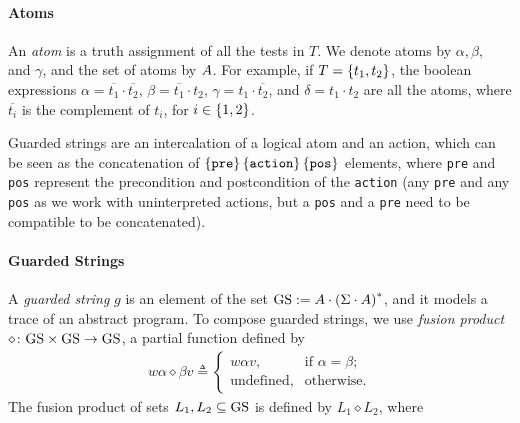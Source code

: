 
\paragraph*{Atoms}
An \emph{atom} is a truth assignment of all the tests in $T$.  %
We denote atoms by $\alpha, \beta,$ and $\gamma$, and the set of atoms by $A$. For example, if $T=\left\{t_1,t_2\right\}$, the boolean expressions $\alpha=\overline{t_1}\cdot \overline{t_2}$, $\beta=\overline{t_1}\cdot {t_2}$, $\gamma=t_1\cdot \overline{t_2}$, and $\delta=t_1\cdot {t_2}$ are all the atoms, where $\overline{t_i}$ is the complement of $t_i$, for $i\in \left\{1,2\right\}$.

Guarded strings 
are an intercalation of a logical atom and an action, which can be seen as the concatenation 
of $\left\{\texttt{pre}\right\}\left\{\texttt{action}\right\}\left\{\texttt{pos}\right\}$ elements, where \texttt{pre} and \texttt{pos} represent the precondition and postcondition of the \texttt{action} (any \texttt{pre} and any \texttt{pos} as we work with uninterpreted actions, but a \texttt{pos} and a \texttt{pre} need to be compatible to be concatenated). 

\paragraph*{Guarded Strings} A \emph{guarded string} %
$g$ is an element of the set $\text{GS} := A \cdot \left(\Sigma\cdot A\right)^{*}$, and it models a trace of an abstract program. %
To compose guarded strings, we use \emph{fusion product} $\diamond\colon \text{GS}\times\text{GS}\rightarrow\text{GS}$, a partial function defined by
\begin{align}
w\alpha \diamond \beta v \triangleq 
	\begin{cases}
		w \alpha v, & \text{if $\alpha=\beta$};\\
		\text{undefined,}& \text{otherwise.}
	\end{cases}
\end{align}
The fusion product of sets $L_1,L_2\subseteq \text{GS}$ is defined by $L_1\diamond L_2$, where 

